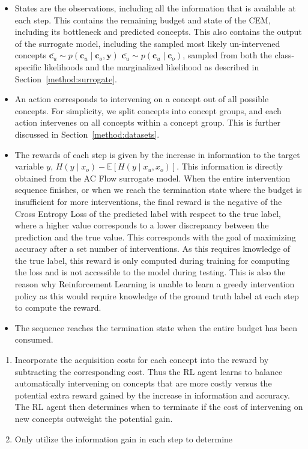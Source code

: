 \begin{itemize}
    \item States are the observations, including all the information that is available
    at each step. This contains the remaining budget and 
    state of the CEM, including its bottleneck and predicted concepts.
    This also contains the output of the surrogate model, 
    including the sampled most likely un-intervened concepts 
    $\bar{\mathbf{c}_u} \sim p(\mathbf{c}_u \mid \mathbf{c}_o, \mathbf{y})$
    $\bar{\mathbf{c}_u} \sim p(\mathbf{c}_u \mid \mathbf{c}_o)$, sampled from
    both the class-specific likelihoods and the marginalized likelihood
    as described in Section~\ref{method:surrogate}.
    \item An action corresponds to intervening on a concept out of all possible concepts.
    For simplicity, we split concepts into concept groups, and each action intervenes on all concepts
    within a concept group. This is further discussed in Section~\ref{method:datasets}.
    \item The rewards of each step is given by the increase in 
    information to the target variable $y$, $H(y \mid x_o) - \mathbb{E} [H(y \mid x_u, x_o)]$. This information
    is directly obtained from the AC Flow surrogate model. When the entire intervention sequence finishes,
    or when we reach the termination state where the budget is insufficient for more interventions,
    the final reward is the negative of the Cross Entropy Loss of the predicted label with respect to the 
    true label, where a higher value corresponds to 
    a lower discrepancy between the prediction and the true value. This corresponds with the goal of 
    maximizing accuracy after a set number of interventions. As this requires knowledge of the true label,
    this reward is only computed during training for computing the loss
    and is not accessible to the model during testing. This is also the reason why
    Reinforcement Learning is unable to learn a greedy intervention policy as this would
    require knowledge of the ground truth label at each step to compute the reward.
    \item The sequence reaches the termination state when the entire budget has been consumed.
    
\end{itemize}


\begin{enumerate}
    \item Incorporate the acquisition costs for each concept into the reward by subtracting
    the corresponding cost. Thus the RL agent
    learns to balance automatically intervening on concepts that are more costly versus the
    potential extra reward gained by the increase in information and accuracy. The RL agent then determines when to terminate
    if the cost of intervening on new concepts outweight the potential gain.
    \item Only utilize the information gain in each step to determine 
    
\end{enumerate}

